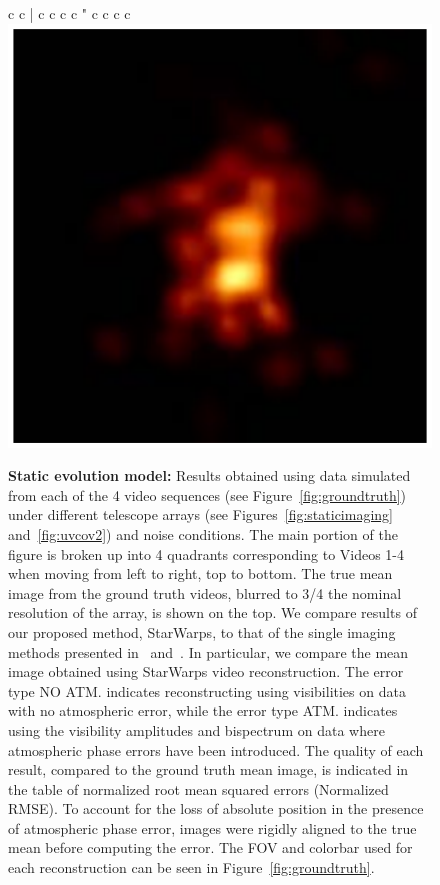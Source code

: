 \begin{figure}
\begin{center}
\begin{tabular}{  c c | c  c  c  c "  c  c  c  c  }
			\includegraphics[height=.1\linewidth]{figures/starwarps_results/hotakamovie_45/ehtfuture1_100_compare/none_amp-clphase_blur025.pdf} 
			\\ 
		\end{tabular}
		\caption{{\bf Static evolution model:} Results obtained using data simulated from each of the 4 video sequences (see Figure~\ref{fig:groundtruth}) under different telescope arrays (see Figures~\ref{fig:staticimaging} and~\ref{fig:uvcov2}) and noise conditions. The main portion of the figure is broken up into 4 quadrants corresponding to Videos 1-4 when moving from left to right, top to bottom. The true mean image from the ground truth videos, blurred to 3/4 the nominal resolution of the array, is shown on the top. We compare results of our proposed method, StarWarps, to that of the single imaging methods presented in~\cite{freek} and~\cite{andrew}. In particular, we compare the mean image obtained using StarWarps video reconstruction. The error type NO ATM. indicates reconstructing using visibilities on data with no atmospheric error, while the error type ATM. indicates using the visibility amplitudes and bispectrum on data where atmospheric phase errors have been introduced. The quality of each result, compared to the ground truth mean image, is indicated in the table of normalized root mean squared errors (Normalized RMSE). To account for the loss of absolute position in the presence of atmospheric phase error, images were rigidly aligned to the true mean before computing the error. The FOV and colorbar used for each reconstruction can be seen in Figure~\ref{fig:groundtruth}. }
		\label{fig:staticevolutionresults}
	\end{center}
\end{figure}



























































